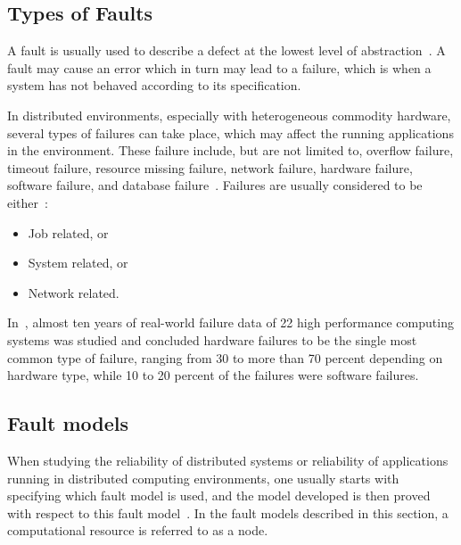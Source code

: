 \documentclass{cslthse-msc}
\begin{document}
\subsection{Types of Faults} \label{subsec:background_types_of_faults}
A fault is usually used to describe a defect at the lowest level of abstraction~\cite{faultTolerantFundamentals}. A fault may cause an error which in turn may lead to a failure, which is when a system has not behaved according to its specification.

In distributed environments, especially with heterogeneous commodity hardware, several types of failures can take place, which may affect the running applications in the environment. These failure include, but are not limited to, overflow failure, timeout failure, resource missing failure, network failure, hardware failure, software failure, and database failure~\cite{cloudServiceRel}. Failures are usually considered to be either~\cite{evalOfGridRel}:

\begin{itemize}
	\item Job related, or
	\item System related, or
	\item Network related.
\end{itemize}

In~\cite{studyOfFailures}, almost ten years of real-world failure data of 22 high performance computing systems was studied and concluded hardware failures to be the single most common type of failure, ranging from 30 to more than 70 percent depending on hardware type, while 10 to 20 percent of the failures were software failures.

\subsection{Fault models} \label{subsec:background_fault_models}
When studying the reliability of distributed systems or reliability of applications running in distributed computing environments, one usually starts with specifying which fault model is used, and the model developed is then proved with respect to this fault model~\cite{faultTolerantFundamentals}. In the fault models described in this section, a computational resource is referred to as a node.
\end{document}
